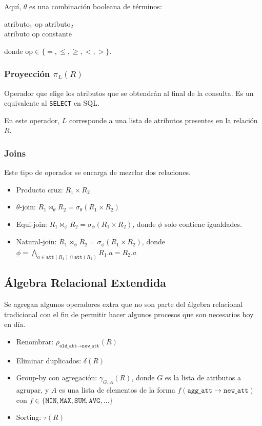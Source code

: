Aquí, $\theta$ es una combinación booleana de términos:
\begin{center}
  atributo$_1$ op atributo$_2$\\
  atributo op constante
\end{center}
donde $\text{op} \in \{ =, \leq, \geq, <, > \}$.

\subsubsection{Proyección $\pi_L(R)$}
Operador que elige los atributos que se obtendrán al final de la consulta. Es un equivalente al \texttt{SELECT} en SQL.

En este operador, $L$ corresponde a una lista de atributos presentes en la relación $R$.

\subsubsection{Joins}
Este tipo de operador se encarga de mezclar dos relaciones.
\begin{itemize}
  \item Producto cruz: $R_1 \times R_2$
  \item $\theta$-join: $R_1 \bowtie_\theta R_2 = \sigma_\theta(R_1 \times R_2)$
  \item Equi-join: $R_1 \bowtie_\phi R_2 = \sigma_\phi(R_1 \times R_2)$, donde $\phi$ solo contiene igualdades.
  \item Natural-join: $R_1 \bowtie_\phi R_2 = \sigma_\phi(R_1 \times R_2)$, donde $\phi = \bigwedge_{a \in \texttt{att}(R_1) \cap \texttt{att}(R_2)} R_1.a = R_2.a$
\end{itemize}

\subsection{Álgebra Relacional Extendida}
Se agregan algunos operadores extra que no son parte del álgebra relacional tradicional con el fin de permitir hacer algunos procesos que son necesarios hoy en día.
\begin{itemize}
  \item Renombrar: $\rho_{\texttt{old\_att} \rightarrow  \texttt{new\_att}}(R)$
  \item Eliminar duplicados: $\delta(R)$
  \item Group-by con agregación: $\gamma_{G, A}(R)$, donde $G$ es la lista de atributos a agrupar, y $A$ es una lista de elementos de la forma $f(\texttt{agg\_att} \rightarrow \texttt{new\_att})$ con $f \in \{ \texttt{MIN}, \texttt{MAX}, \texttt{SUM}, \texttt{AVG}, \ldots \}$
  \item Sorting: $\tau(R)$
\end{itemize} 
\pagebreak

